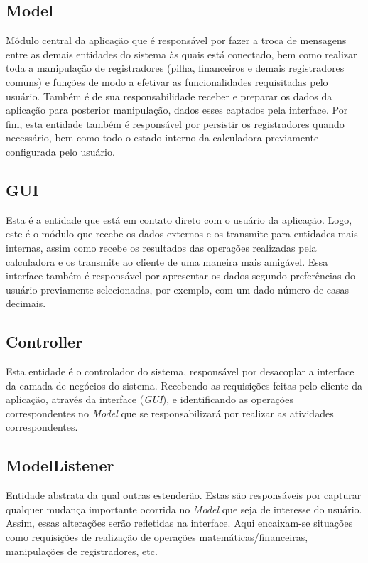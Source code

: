 \subsection{Model}
Módulo central da aplicação que é responsável por fazer a troca de mensagens entre as demais entidades do sistema às quais está conectado, bem como realizar toda a manipulação de registradores (pilha, financeiros e demais registradores comuns) e funções de modo a efetivar as funcionalidades requisitadas pelo usuário. Também é de sua responsabilidade receber e preparar os dados da aplicação para posterior manipulação, dados esses captados pela interface. Por fim, esta entidade também é responsável por persistir os registradores quando necessário, bem como todo o estado interno da calculadora previamente configurada pelo usuário.

\subsection{GUI}
Esta é a entidade que está em contato direto com o usuário da aplicação. Logo, este é o módulo que recebe os dados externos e os transmite para entidades mais internas, assim como recebe os resultados das operações realizadas pela calculadora e os transmite ao cliente de uma maneira mais amigável. Essa interface também é responsável por apresentar os dados segundo preferências do usuário previamente selecionadas, por exemplo, com um dado número de casas decimais.

\subsection{Controller}
Esta entidade é o controlador do sistema, responsável por desacoplar a interface da camada de negócios do sistema. Recebendo as requisições feitas pelo cliente da aplicação, através da interface (\textit{GUI}), e identificando as operações correspondentes no \textit{Model} que se responsabilizará por realizar as atividades correspondentes.

\subsection{ModelListener}
Entidade abstrata da qual outras estenderão. Estas são responsáveis por capturar qualquer mudança importante ocorrida no \textit{Model} que seja de interesse do usuário. Assim, essas alte\-rações serão refletidas na interface. Aqui encaixam-se situações como requisições de realização de operações matemáticas/financeiras, manipulações de registradores, etc.

